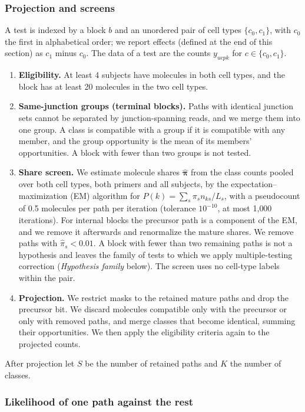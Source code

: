 \documentclass[11pt]{article}
\begin{document}
\subsubsection{Projection and screens}

A test is indexed by a block $b$ and an unordered pair of cell types $\{c_0,c_1\}$, with $c_0$ the first in alphabetical order; we report effects (defined at the end of this section) as $c_1$ minus $c_0$. The data of a test are the counts $y_{ucpk}$ for $c\in\{c_0,c_1\}$.
\begin{enumerate}[leftmargin=*]
  \item \textbf{Eligibility.} At least 4 subjects have molecules in both cell types, and the block has at least 20 molecules in the two cell types.
  \item \textbf{Same-junction groups (terminal blocks).} Paths with identical junction sets cannot be separated by junction-spanning reads, and we merge them into one group. A class is compatible with a group if it is compatible with any member, and the group opportunity is the mean of its members' opportunities. A block with fewer than two groups is not tested.
  \item \textbf{Share screen.} We estimate molecule shares $\widehat{\bm\pi}$ from the class counts pooled over both cell types, both primers and all subjects, by the expectation--maximization (EM) algorithm for $P(k)=\sum_s\pi_sn_{ks}/L_s$, with a pseudocount of 0.5 molecules per path per iteration (tolerance $10^{-10}$, at most 1{,}000 iterations). For internal blocks the precursor path is a component of the EM, and we remove it afterwards and renormalize the mature shares. We remove paths with $\widehat\pi_s<0.01$. A block with fewer than two remaining paths is not a hypothesis and leaves the family of tests to which we apply multiple-testing correction (\emph{Hypothesis family} below). The screen uses no cell-type labels within the pair.
  \item \textbf{Projection.} We restrict masks to the retained mature paths and drop the precursor bit. We discard molecules compatible only with the precursor or only with removed paths, and merge classes that become identical, summing their opportunities. We then apply the eligibility criteria again to the projected counts.
\end{enumerate}
After projection let $S$ be the number of retained paths and $K$ the number of classes.

\subsubsection{Likelihood of one path against the rest}
\end{document}
